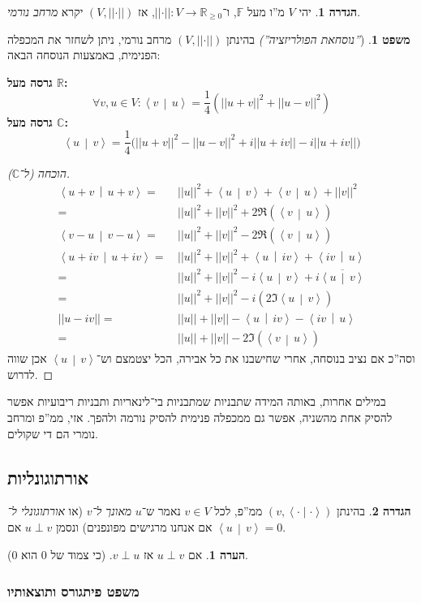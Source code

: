 \documentclass[a4paper]{article}
\newcommand\R     {\mathbb{R}}
\newcommand\C     {\mathbb{C}}
\newcommand\ra    {\rangle}
\newcommand\la    {\langle}
\newcommand\ol    {\overline}
\newcommand\F         {\mathbb{F}}
\newcommand\co        {\colon}
\newcommand\norm[1]   {\left \vert \left \vert #1 \right \vert \right \vert}
\newcommand\snorm     {\left \vert \left \vert \cdot \right \vert \right \vert}
\newcommand\smut      {\left \la \cdot \mid \cdot \right \ra}
\newcommand\mut [2]   {\left \la #1 \,\middle\vert\, #2 \right \ra}
\theoremstyle{definition}
\newtheorem{Theorem}{\color{myblue}משפט}
\newtheorem{Definition}{\color{mygreen}הגדרה}
\newtheorem{Remark}{\color{mycyan}הערה}
\newcommand\theo  [1] {\begin{Theorem}#1\end{Theorem}}
\newcommand\defi  [1] {\begin{Definition}#1\end{Definition}}
\newcommand\rmark [1] {\begin{Remark}#1\end{Remark}}
\begin{document}
	\defi{יהי $V$ מ''ו מעל $\F$, ו־$\snorm \co V \to \R_{\ge 0}$, אז $(V, \snorm)$ יקרא \textit{מרחב נורמי}. }
	\theo{(\textit{''נוסחאת הפולריזציה'')} בהינתן $(V, \snorm)$ מרחב נורמי, ניתן לשחזר את המכפלה הפנימית, באמצעות הנוסחה הבאה: 
		
		\textbf{גרסה מעל $\bm{\R}$: }
		\[ \forall v, u \in V \co \mut{v}{u} = \frac{1}{4}(\norm{u + v}^2 + \norm{u - v}^2) \]
		\textbf{גרסה מעל $\C$: }
		\[ \mut{u}{v} = \frac{1}{4}\Big(\norm{u + v}^2 - \norm{u - v}^2 + i\norm{u + iv} - i\norm{u + iv}\Big) \]
	}
	\begin{proof}[הוכחה (ל־$\bm{\C}$)]
		\begin{align*}
			\mut{u + v}{u + v} =\,& \norm{u}^2 + \mut{u}{v} + \mut{v}{u} + \norm{v}^2 \\
			=\,& \norm{u}^2 + \norm{v}^2 + 2\Re(\mut{v}{u}) \\
			\mut{v - u}{v - u} = \, & \norm{u}^2 + \norm{v}^2 - 2\Re(\mut{v}{u}) \\
			\mut{u + iv}{u + iv} =\,& \norm{u}^2 + \norm{v}^2 + \mut{u}{iv} + \mut{iv}{u}  \\
			=\,& \norm{u}^2 + \norm{v}^2 - i\mut{u}{v} + i\ol{\mut{u}{v}} \\
			=\,& \norm{u}^2 + \norm{v}^2 - i(2 \Im\mut{u}{v}) \\
			\norm{u - iv} =\,& \norm{u} + \norm{v} - \mut{u}{iv} - \mut{iv}{u} \\
			=\,& \norm{u} + \norm{v} - 2\Im(\mut{v}{u})
		\end{align*}
		וסה''כ אם נציב בנוסחה, אחרי שחישבנו את כל אבירה, הכל יצטמצם וש־$\mut{u}{v}$ אכן שווה לדרוש. 
	\end{proof}
	
	במילים אחרות, באותה המידה שתבניות שמתבניות בי־לינאריות ותבניות ריבועיות אפשר להסיק אחת מהשניה, אפשר גם ממכפלה פנימית להסיק נורמה ולהפך. אזי, ממ''פ ומרחב נומרי הם די שקולים. 
	
	\subsection{אורתוגונליות}
	
	\defi{בהינתן $(v, \smut)$ ממ''פ, לכל $v \in V$ נאמר ש־$u$ \textit{מאונך ל־$v$} (או \textit{אורתוגונלי ל־} אם אנחנו מרגישים מפונפנים) ונסמן $u\perp v$ אם $\mut{u}{v} = 0$. }
	
	\rmark{אם $u \perp v$ אז $v \perp u$. (כי צמוד של $0$ הוא $0$). }
	
	\subsubsection{משפט פיתגורס ותוצאותיו}
	
\end{document}

